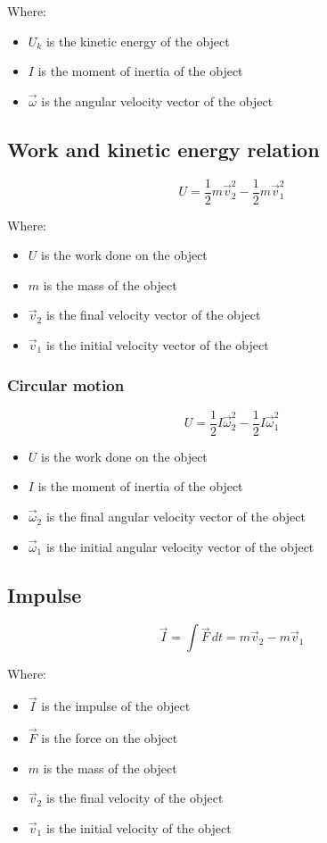 \documentclass[11pt]{article}
\begin{document}
Where:
\begin{itemize}
\item \(U_k\) is the kinetic energy of the object
\item \(I\) is the moment of inertia of the object
\item \(\vec{\omega}\) is the angular velocity vector of the object
\end{itemize}
\subsection{Work and kinetic energy relation}
\label{sec:org9c73656}
\[U = \frac{1}{2} m \vec{v}_2^2 - \frac{1}{2} m \vec{v}_1^2\]

Where:
\begin{itemize}
\item \(U\) is the work done on the object
\item \(m\) is the mass of the object
\item \(\vec{v}_2\) is the final velocity vector of the object
\item \(\vec{v}_1\) is the initial velocity vector of the object
\end{itemize}
\subsubsection{Circular motion}
\label{sec:orga7cca9f}
\[U = \frac{1}{2} I \vec{\omega}_2^2 - \frac{1}{2} I \vec{\omega}_1^2\]

\begin{itemize}
\item \(U\) is the work done on the object
\item \(I\) is the moment of inertia of the object
\item \(\vec{\omega}_2\) is the final angular velocity vector of the object
\item \(\vec{\omega}_1\) is the initial angular velocity vector of the object
\end{itemize}
\subsection{Impulse}
\label{sec:org97c222d}
\[\vec{I} = \int \vec{F} \, dt = m \vec{v}_2 - m \vec{v}_1\]

Where:
\begin{itemize}
\item \(\vec{I}\) is the impulse of the object
\item \(\vec{F}\) is the force on the object
\item \(m\) is the mass of the object
\item \(\vec{v}_2\) is the final velocity of the object
\item \(\vec{v}_1\) is the initial velocity of the object
\end{itemize}
\end{document}
